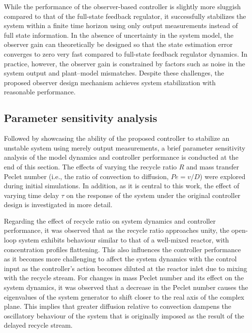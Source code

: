 While the performance of the observer-based controller is slightly more sluggish compared to that of the full-state feedback regulator, it successfully stabilizes the system within a finite time horizon using only output measurements instead of full state information. In the absence of uncertainty in the system model, the observer gain can theoretically be designed so that the state estimation error converges to zero very fast compared to full-state feedback regulator dynamics. In practice, however, the observer gain is constrained by factors such as noise in the system output and plant--model mismatches. Despite these challenges, the proposed observer design mechanism achieves system stabilization with reasonable performance.

\subsection{Parameter sensitivity analysis}

Followed by showcasing the ability of the proposed controller to stabilize an unstable system using merely output measurements, a brief parameter sensitivity analysis of the model dynamics and controller performance is conducted at the end of this section. The effects of varying the recycle ratio $R$ and mass transfer Peclet number (i.e., the ratio of convection to diffusion, $Pe = v/D$) were explored during initial simulations. In addition, as it is central to this work, the effect of varying time delay $\tau$ on the response of the system under the original controller design is investigated in more detail.

Regarding the effect of recycle ratio on system dynamics and controller performance, it was observed that as the recycle ratio approaches unity, the open-loop system exhibits behaviour similar to that of a well-mixed reactor, with concentration profiles flattening. This also influences the controller performance as it becomes more challenging to affect the system dynamics with the control input as the controller's action becomes diluted at the reactor inlet due to mixing with the recycle stream. For changes in mass Peclet number and its effect on the system dynamics, it was observed that a decrease in the Peclet number causes the eigenvalues of the system generator to shift closer to the real axis of the complex plane. This implies that greater diffusion relative to convection dampens the oscillatory behaviour of the system that is originally imposed as the result of the delayed recycle stream.

